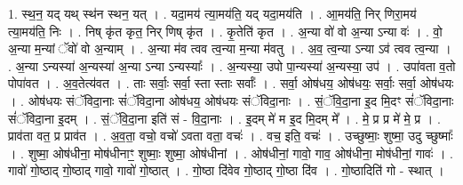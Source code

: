 \documentclass[17pt]{extarticle}
\begin{document}
1. स्थ॒न॒ यद् यथ् स्थ॑न स्थन॒ यत् । . यदा॒मय॑ त्या॒मय॑ति॒ यद् यदा॒मय॑ति । . आ॒मय॑ति॒ निर् णिरा॒मय॑ त्या॒मय॑ति॒ निः । . निष् कृ॑त कृत॒ निर् णिष् कृ॑त । . कृ॒तेति॑ कृत । . अ॒न्या वो॑ वो अ॒न्या ऽन्या वः॑ । . वो॒ अ॒न्या म॒न्यां ॅवो॑ वो अ॒न्याम् । . अ॒न्या म॑व त्वव त्व॒न्या म॒न्या म॑वतु । . अ॒व॒ त्व॒न्या ऽन्या ऽव॑ त्वव त्व॒न्या । . अ॒न्या ऽन्यस्या॑ अ॒न्यस्या॑ अ॒न्या ऽन्या ऽन्यस्याः᳚ । . अ॒न्यस्या॒ उपो पा॒न्यस्या॑ अ॒न्यस्या॒ उप॑ । . उपा॑वता व॒तो पोपा॑वत । . अ॒व॒तेत्य॑वत । . ताः सर्वाः॒ सर्वा॒ स्ता स्ताः सर्वाः᳚ । . सर्वा॒ ओष॑धय॒ ओष॑धयः॒ सर्वाः॒ सर्वा॒ ओष॑धयः । . ओष॑धयः संॅविदा॒नाः सं॑ॅविदा॒ना ओष॑धय॒ ओष॑धयः संॅविदा॒नाः । . सं॒ॅवि॒दा॒ना इ॒द मि॒दꣳ सं॑ॅविदा॒नाः सं॑ॅविदा॒ना इ॒दम् । . सं॒ॅवि॒दा॒ना इति॑ सं - वि॒दा॒नाः । . इ॒दम् मे॑ म इ॒द मि॒दम् मे᳚ । . मे॒ प्र प्र मे॑ मे॒ प्र । . प्राव॑ता वत॒ प्र प्राव॑त । . अ॒व॒ता॒ वचो॒ वचो॑ ऽवता वता॒ वचः॑ । . वच॒ इति॒ वचः॑ । . उच्छुष्माः॒ शुष्मा॒ उदु च्छुष्माः᳚ । . शुष्मा॒ ओष॑धीना॒ मोष॑धीनाꣳ॒॒ शुष्माः॒ शुष्मा॒ ओष॑धीनां । . ओष॑धीनां॒ गावो॒ गाव॒ ओष॑धीना॒ मोष॑धीनां॒ गावः॑ । . गावो॑ गो॒ष्ठाद् गो॒ष्ठाद् गावो॒ गावो॑ गो॒ष्ठात् । . गो॒ष्ठा दि॑वेव गो॒ष्ठाद् गो॒ष्ठा दि॑व । . गो॒ष्ठादिति॑ गो - स्थात् । \newline
\end{document}
